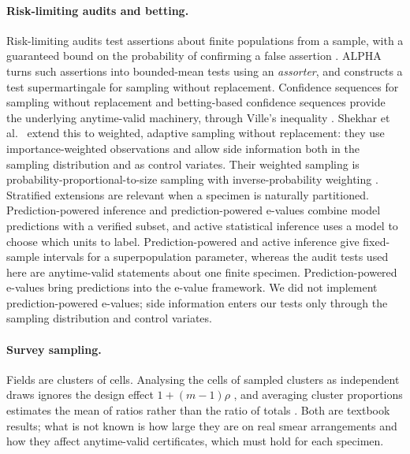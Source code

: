 \documentclass[11pt]{article}
\theoremstyle{remark}
\theoremstyle{definition}
\begin{document}
\paragraph{Risk-limiting audits and betting.} Risk-limiting audits test assertions about finite populations from a sample, with a guaranteed bound on the probability of confirming a false assertion \cite{lindeman2012gentle}. ALPHA \cite{stark2023alpha} turns such assertions into bounded-mean tests using an \emph{assorter}, and constructs a test supermartingale for sampling without replacement. Confidence sequences for sampling without replacement \cite{waudbysmith2020wor} and betting-based confidence sequences \cite{waudbysmith2024betting} provide the underlying anytime-valid machinery, through Ville's inequality \cite{ville1939}. Shekhar et al.\ \cite{shekhar2023rlfa} extend this to weighted, adaptive sampling without replacement: they use importance-weighted observations and allow side information both in the sampling distribution and as control variates. Their weighted sampling is probability-proportional-to-size sampling with inverse-probability weighting \cite{hansen1943,horvitz1952}. Stratified extensions \cite{spertus2024stratified} are relevant when a specimen is naturally partitioned. Prediction-powered inference \cite{angelopoulos2023ppi} and prediction-powered e-values \cite{csillag2025ppe} combine model predictions with a verified subset, and active statistical inference \cite{zrnic2024active} uses a model to choose which units to label. Prediction-powered and active inference give fixed-sample intervals for a superpopulation parameter, whereas the audit tests used here are anytime-valid statements about one finite specimen. Prediction-powered e-values bring predictions into the e-value framework. We did not implement prediction-powered e-values; side information enters our tests only through the sampling distribution and control variates.

\paragraph{Survey sampling.} Fields are clusters of cells. Analysing the cells of sampled clusters as independent draws ignores the design effect $1+(m-1)\rho$ \cite{kish1965}, and averaging cluster proportions estimates the mean of ratios rather than the ratio of totals \cite{cochran1977}. Both are textbook results; what is not known is how large they are on real smear arrangements and how they affect anytime-valid certificates, which must hold for each specimen.
\end{document}

